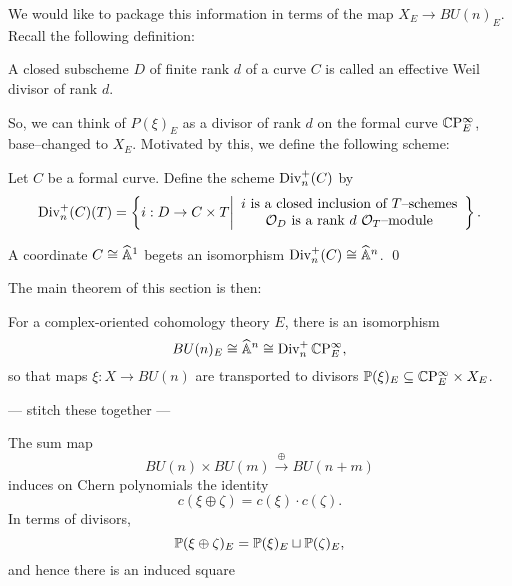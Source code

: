 We would like to package this information in terms of the map $X_E \to BU(n)_E$.  Recall the following definition:
\begin{definition}
A closed subscheme $D$ of finite rank $d$ of a curve $C$ is called an effective Weil divisor of rank $d$.
\end{definition}
\noindent So, we can think of $P(\xi)_E$ as a divisor of rank $d$ on the formal curve $\CP^\infty_E$, base--changed to $X_E$.  Motivated by this, we define the following scheme:
\begin{definition}
 Let $C$ be a formal curve.  Define the scheme $\Div_n^+(C)$ by \[\Div_n^+(C)(T) = \left\{i: D \to C \times T \middle| \begin{array}{c} \text{$i$ is a closed inclusion of $T$--schemes} \\ \text{$\O_D$ is a rank $d$ $\O_T$--module} \end{array}\right\}.\]
\end{definition}
\begin{lemma}
A coordinate $C \cong \A^1$ begets an isomorphism $\Div_n^+(C) \cong \A^n$. \qed
\end{lemma}

The main theorem of this section is then:
\begin{theorem}
For a complex-oriented cohomology theory $E$, there is an isomorphism \[BU(n)_E \cong \A^n \cong \Div_n^+ \CP^\infty_E,\] so that maps $\xi: X \to BU(n)$ are transported to divisors $\P(\xi)_E \subseteq \CP^\infty_E \times X_E$.
\end{theorem}

--- stitch these together ---

\begin{lemma}
The sum map \[BU(n) \times BU(m) \xrightarrow\oplus BU(n+m)\] induces on Chern polynomials the identity \[c(\xi \oplus \zeta) = c(\xi) \cdot c(\zeta).\]  In terms of divisors, \[\P(\xi \oplus \zeta)_E = \P(\xi)_E \sqcup \P(\zeta)_E,\] and hence there is an induced square
\begin{center}
\end{center}
\end{lemma}

